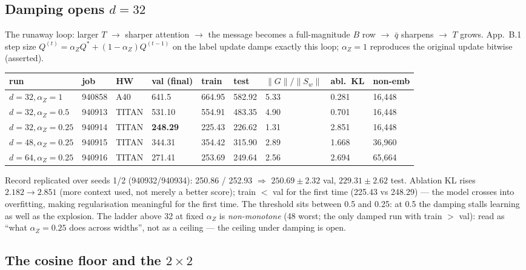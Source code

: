 \documentclass[10pt,a4paper]{article}
\newcommand{\msgu}{\ensuremath{\lVert G\rVert/\lVert S_w\rVert}}
\newcommand{\qbar}{\ensuremath{\bar q}}
\newcommand{\pmm}[2]{\ensuremath{#1 \pm #2}}
\begin{document}
\subsection{Damping opens $d=32$}

The runaway loop: larger $T$ $\to$ sharper attention $\to$ the message becomes a
full-magnitude $B$ row $\to$ \qbar{} sharpens $\to$ $T$ grows. App.~B.1 step size
$Q^{(t)} = \alpha_Z Q^{*} + (1-\alpha_Z) Q^{(t-1)}$ on the label update damps exactly this
loop; $\alpha_Z=1$ reproduces the original update bitwise (asserted).

\begin{table}[h]\centering\small
\begin{tabular}{lllllllll}
\toprule
run & job & HW & val (final) & train & test & \msgu{} & abl.\ KL & non-emb\\
\midrule
$d{=}32, \alpha_Z{=}1$ & 940858 & A40 & 641.5 & 664.95 & 582.92 & 5.33 & 0.281 & 16{,}448\\
$d{=}32, \alpha_Z{=}0.5$ & 940913 & TITAN & 531.10 & 554.91 & 483.35 & 4.90 & 0.701 & 16{,}448\\
\textbf{$d{=}32, \alpha_Z{=}0.25$} & 940914 & TITAN & \textbf{248.29} & 225.43 & 226.62 & 1.31 & 2.851 & 16{,}448\\
$d{=}48, \alpha_Z{=}0.25$ & 940915 & TITAN & 344.31 & 354.42 & 315.90 & 2.89 & 1.668 & 36{,}960\\
$d{=}64, \alpha_Z{=}0.25$ & 940916 & TITAN & 271.41 & 253.69 & 249.64 & 2.56 & 2.694 & 65{,}664\\
\bottomrule
\end{tabular}
\end{table}

Record replicated over seeds 1/2 (940932/940934): 250.86 / 252.93 $\Rightarrow$
\pmm{250.69}{2.32} val, \pmm{229.31}{2.62} test. Ablation KL rises $2.182 \to 2.851$ (more
context used, not merely a better score); train $<$ val for the first time (225.43 vs
248.29) --- the model crosses into overfitting, making regularisation meaningful for the
first time. The threshold sits between 0.5 and 0.25: at 0.5 the damping stalls learning as
well as the explosion. The ladder above 32 at fixed $\alpha_Z$ is \emph{non-monotone}
(48 worst; the only damped run with train $>$ val): read as ``what $\alpha_Z=0.25$ does
across widths'', not as a ceiling --- the ceiling under damping is open.

\subsection{The cosine floor and the $2\times 2$}
\end{document}
